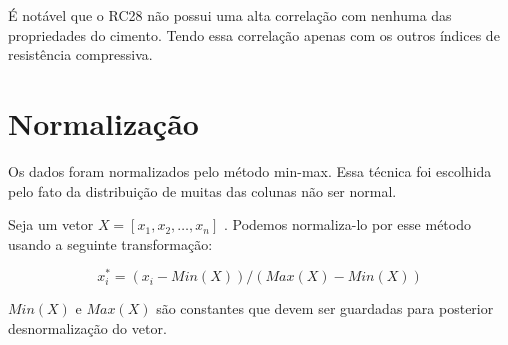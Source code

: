 É notável que o RC28 não possui uma alta correlação com nenhuma das propriedades
do cimento. Tendo essa correlação apenas com os outros índices de resistência compressiva.

\section{Normalização}

Os dados foram normalizados pelo método min-max. Essa técnica foi escolhida pelo
fato da distribuição de muitas das colunas não ser normal.

Seja um vetor $X =[x_1,x_2,\dots,x_n]$ . Podemos normaliza-lo por esse método usando a
seguinte transformação:


\[
x^*_{i} = ( x_i - Min(X))/(Max(X) - Min(X)) 
\]

$Min(X)$  e $Max(X)$ são constantes que devem ser guardadas para posterior
desnormalização do vetor.






